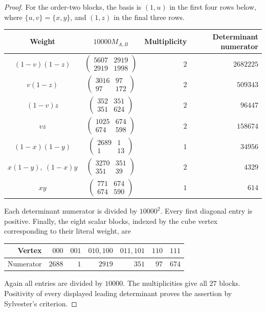 \begin{proof}
For the order-two blocks, the basis is $(1,u)$ in the first four rows
below, where $\{u,v\}=\{x,y\}$, and $(1,z)$ in the final three rows.
\begin{center}
\renewcommand{\arraystretch}{1.4}
\begin{tabular}{ccrr}
\toprule
Weight & $10000M_{A,B}$ & Multiplicity & Determinant numerator\\
\midrule
$(1-v)(1-z)$ & $\begin{pmatrix}5607&2919\\2919&1998\end{pmatrix}$ & $2$ & $2682225$\\
$v(1-z)$ & $\begin{pmatrix}3016&97\\97&172\end{pmatrix}$ & $2$ & $509343$\\
$(1-v)z$ & $\begin{pmatrix}352&351\\351&624\end{pmatrix}$ & $2$ & $96447$\\
$vz$ & $\begin{pmatrix}1025&674\\674&598\end{pmatrix}$ & $2$ & $158674$\\
$(1-x)(1-y)$ & $\begin{pmatrix}2689&1\\1&13\end{pmatrix}$ & $1$ & $34956$\\
$x(1-y),\ (1-x)y$ & $\begin{pmatrix}3270&351\\351&39\end{pmatrix}$ & $2$ & $4329$\\
$xy$ & $\begin{pmatrix}771&674\\674&590\end{pmatrix}$ & $1$ & $614$\\
\bottomrule
\end{tabular}
\end{center}
Each determinant numerator is divided by $10000^2$. Every first diagonal
entry is positive. Finally, the eight scalar blocks, indexed by the cube
vertex corresponding to their literal weight, are
\begin{center}
\begin{tabular}{rrrrrrr}
\toprule
Vertex & $000$ & $001$ & $010,100$ & $011,101$ & $110$ & $111$\\
\midrule
Numerator & $2688$ & $1$ & $2919$ & $351$ & $97$ & $674$\\
\bottomrule
\end{tabular}
\end{center}
Again all entries are divided by $10000$. The multiplicities give all
$27$ blocks. Positivity of every displayed leading determinant proves
the assertion by Sylvester's criterion.
\end{proof}

